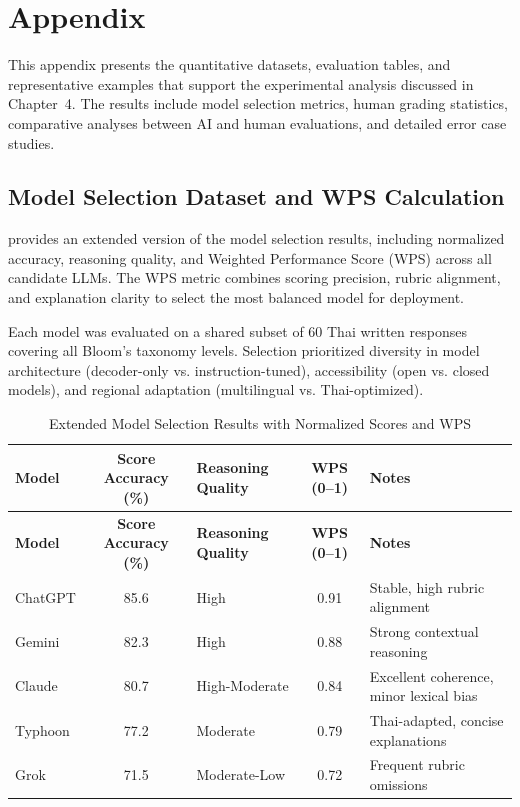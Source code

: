 \chapter{Appendix \thechapter}\label{appendixB}

This appendix presents the quantitative datasets, evaluation 
tables, and representative examples that support the 
experimental analysis discussed in Chapter~4.  
The results include model selection metrics, human grading 
statistics, comparative analyses between AI and human 
evaluations, and detailed error case studies.

\section{Model Selection Dataset and WPS Calculation}

 provides an extended 
version of the model selection results, including normalized 
accuracy, reasoning quality, and Weighted Performance Score 
(WPS) across all candidate LLMs. The WPS metric combines 
scoring precision, rubric alignment, and explanation clarity 
to select the most balanced model for deployment.

Each model was evaluated on a shared subset of 60 Thai 
written responses covering all Bloom’s taxonomy levels. 
Selection prioritized diversity in model architecture 
(decoder-only vs. instruction-tuned), accessibility 
(open vs. closed models), and regional adaptation 
(multilingual vs. Thai-optimized).

{
\setlength{\LTleft}{-2.2cm}
\setlength{\LTright}{0pt}
\centering
\begin{longtable}{l c l c l}
    \caption{Extended Model Selection Results with Normalized Scores and WPS}
    \label{tab:wps_result_extended}
    \\

    \hline
    \textbf{Model} & \textbf{Score Accuracy (\%)} & \textbf{Reasoning Quality} & \textbf{WPS (0–1)} & \textbf{Notes} \\
    \hline
    \endfirsthead

    \hline
    \textbf{Model} & \textbf{Score Accuracy (\%)} & \textbf{Reasoning Quality} & \textbf{WPS (0–1)} & \textbf{Notes} \\
    \hline
    \endhead

    \hline
    \endfoot

    ChatGPT & 85.6 & High & 0.91 & Stable, high rubric alignment \\
    Gemini & 82.3 & High & 0.88 & Strong contextual reasoning \\
    Claude & 80.7 & High-Moderate & 0.84 & Excellent coherence, minor lexical bias \\
    Typhoon  & 77.2 & Moderate & 0.79 & Thai-adapted, concise explanations \\
    Grok & 71.5 & Moderate-Low & 0.72 & Frequent rubric omissions \\
    
\end{longtable}
}

